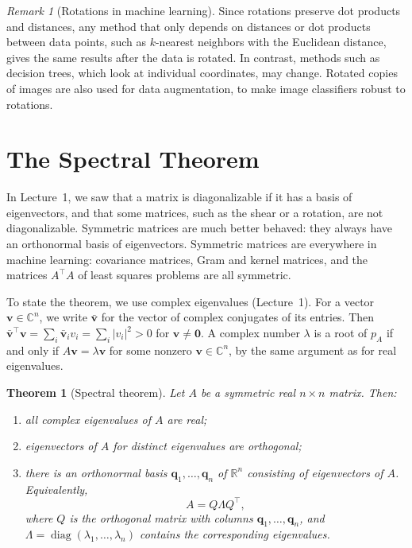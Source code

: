 \documentclass[11pt]{article}
\theoremstyle{definition}
\theoremstyle{plain}
\newtheorem{theorem}[definition]{Theorem}
\theoremstyle{remark}
\newtheorem{remark}[definition]{Remark}
\DeclareMathOperator{\diag}{diag}
\begin{document}
\begin{remark}[Rotations in machine learning]
    Since rotations preserve dot products and distances, any method that only depends on distances or dot products between data points, such as $k$-nearest neighbors with the Euclidean distance, gives the same results after the data is rotated. In contrast, methods such as decision trees, which look at individual coordinates, may change. Rotated copies of images are also used for data augmentation, to make image classifiers robust to rotations.
\end{remark}

\section{The Spectral Theorem}\label{sec:spectral}

In Lecture~1, we saw that a matrix is diagonalizable if it has a basis of eigenvectors, and that some matrices, such as the shear or a rotation, are not diagonalizable. Symmetric matrices are much better behaved: they always have an orthonormal basis of eigenvectors. Symmetric matrices are everywhere in machine learning: covariance matrices, Gram and kernel matrices, and the matrices $A^\top A$ of least squares problems are all symmetric.

To state the theorem, we use complex eigenvalues (Lecture~1). For a vector $\mathbf{v} \in \mathbb{C}^n$, we write $\bar{\mathbf{v}}$ for the vector of complex conjugates of its entries. Then $\bar{\mathbf{v}}^\top \mathbf{v} = \sum_i \bar{\mathbf{v}}_i v_i = \sum_i |v_i|^2 > 0$ for $\mathbf{v} \neq \mathbf{0}$. A complex number $\lambda$ is a root of $p_A$ if and only if $A\mathbf{v} = \lambda \mathbf{v}$ for some nonzero $\mathbf{v} \in \mathbb{C}^n$, by the same argument as for real eigenvalues.

\begin{theorem}[Spectral theorem]\label{thm:spectral}
    Let $A$ be a symmetric real $n \times n$ matrix. Then:
    \begin{enumerate}
        \item all complex eigenvalues of $A$ are real;
        \item eigenvectors of $A$ for distinct eigenvalues are orthogonal;
        \item there is an orthonormal basis $\mathbf{q}_1, \ldots, \mathbf{q}_n$ of $\mathbb{R}^n$ consisting of eigenvectors of $A$. Equivalently,
        \[A = Q \Lambda Q^\top,\]
        where $Q$ is the orthogonal matrix with columns $\mathbf{q}_1, \ldots, \mathbf{q}_n$, and $\Lambda = \diag(\lambda_1, \ldots, \lambda_n)$ contains the corresponding eigenvalues.
    \end{enumerate}
\end{theorem}
\end{document}
